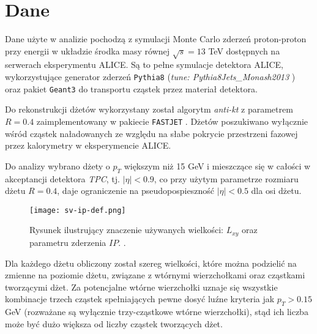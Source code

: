 \section{Dane}
\label{sec:dane}


Dane użyte w analizie pochodzą z symulacji Monte Carlo zderzeń proton-proton przy energii w układzie środka masy równej $\sqrt{s} = 13$ TeV dostępnych na serwerach eksperymentu ALICE.
Są to pełne symulacje detektora ALICE, wykorzystujące generator zderzeń \texttt{Pythia8} \cite{Sjostrand:2007gs} (\textit{tune: Pythia8Jets\_Monash2013} \cite{Skands:2014pea}) oraz pakiet \texttt{Geant3} \cite{Brun:1994aa} do transportu cząstek przez materiał detektora.

Do rekonstrukcji dżetów wykorzystany został algorytm \textit{anti-kt} z parametrem $R = 0.4$ zaimplementowany w pakiecie \texttt{FASTJET} \cite{Cacciari:2011ma}. Dżetów poszukiwano wyłącznie wśród cząstek naładowanych  ze względu na słabe pokrycie przestrzeni fazowej przez kalorymetry w eksperymencie ALICE.

Do analizy wybrano dżety o $p_T$ większym niż 15 GeV i mieszczące się w całości w akceptancji detektora \textit{TPC}, tj. $|\eta| < 0.9$, co przy użytym parametrze rozmiaru dżetu $R = 0.4$, daje ograniczenie na pseudopospieszność $|\eta| < 0.5$ dla osi dżetu.

\begin{figure}[h]
	\centering
	\texttt{[image: sv-ip-def.png]}
	\caption{Rysunek ilustrujący znaczenie używanych wielkości: $L_{xy}$ oraz parametru zderzenia $IP$. .}
	\label{fig:sv-ip-def}
\end{figure}

Dla każdego dżetu obliczony został szereg wielkości, które można podzielić na zmienne na poziomie dżetu, związane z wtórnymi wierzchołkami oraz cząstkami tworzącymi dżet. 
Za potencjalne wtórne wierzchołki uznaje się wszystkie kombinacje trzech cząstek spełniających pewne dosyć luźne kryteria jak $p_T > 0.15$ GeV (rozważane są wyłącznie trzy-cząstkowe wtórne wierzchołki), stąd ich liczba może być dużo większa od liczby cząstek tworzących dżet.


